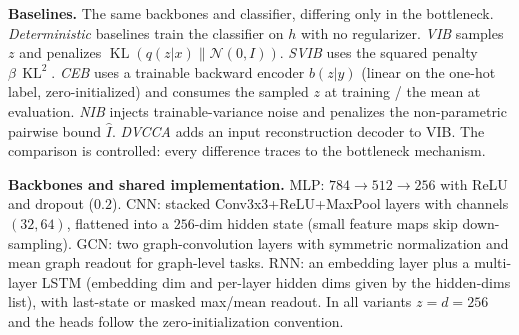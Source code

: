 \textbf{Baselines.} The same backbones and classifier, differing only in the bottleneck.
\emph{Deterministic} baselines train the classifier on $h$ with no regularizer.
\emph{VIB} \cite{alemi2017deep} samples $z$ and penalizes
$\operatorname{KL}(q(z|x)\|\mathcal{N}(0, I))$. \emph{SVIB} \cite{kolchinsky2019caveats}
uses the squared penalty $\beta\,\operatorname{KL}^2$. \emph{CEB}
\cite{fischer2020conditional} uses a trainable backward encoder $b(z|y)$ (linear on the
one-hot label, zero-initialized) and consumes the sampled $z$ at training / the mean at
evaluation. \emph{NIB} \cite{kolchinsky2019nonlinear} injects trainable-variance noise
and penalizes the non-parametric pairwise bound $\widehat I$. \emph{DVCCA}
\cite{abdelaleem2025dvmib} adds an input reconstruction decoder to VIB. The comparison
is controlled: every difference traces to the bottleneck mechanism.

\textbf{Backbones and shared implementation.} MLP: $784 \to 512 \to 256$ with ReLU and
dropout ($0.2$). CNN: stacked Conv3x3+ReLU+MaxPool layers with channels $(32, 64)$,
flattened into a $256$-dim hidden state (small feature maps skip down-sampling). GCN: two
graph-convolution layers with symmetric normalization and mean graph readout for
graph-level tasks. RNN: an embedding layer plus a multi-layer LSTM (embedding dim and
per-layer hidden dims given by the hidden-dims list), with last-state or masked max/mean
readout. In all variants $z = d = 256$ and the heads follow the zero-initialization
convention.
